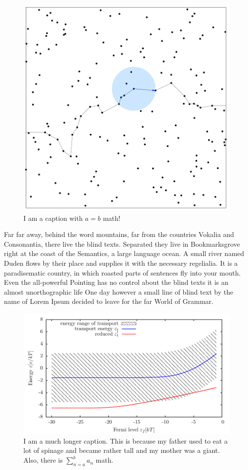 \begin{figure}[htbp]
  \centering
  \includegraphics[width=\textwidth]{content/figures/percolation.pdf}
  \caption{I am a caption with $a=b$ math!}
  \label{fig:bla}
\end{figure}

Far far away, behind the word mountains, far from the countries Vokalia and
Consonantia, there live the blind texts. Separated they live in
Bookmarksgrove right at the coast of the Semantics, a large language
ocean. A small river named Duden flows by their place and supplies it with
the necessary regelialia. It is a paradisematic country, in which roasted
parts of sentences fly into your mouth. Even the all-powerful Pointing has
no control about the blind texts it is an almost unorthographic life One
day however a small line of blind text by the name of Lorem Ipsum decided
to leave for the far World of Grammar.

\begin{figure}[htbp]
  \centering
  \includegraphics[width=\textwidth]{content/figures/etwidth.pdf}
  \caption{I am a much longer caption. This is because my father used to
    eat a lot of spinage and became rather tall and my mother was a
    giant. Also, there is $\sum^b_{n=a} a_n$ math.}
  \label{fig:bla2}
\end{figure}

